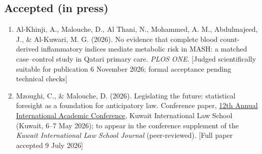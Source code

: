 \documentclass[10pt,a4paper]{article}
\begin{document}
\subsection{Accepted (in press)}
\begin{enumerate}
\item Al-Khinji, A., Malouche, D., Al Thani, N., Mohammed, A. M., Abdulmajeed, J., \& Al-Kuwari, M. G. (2026). No evidence that complete blood count-derived inflammatory indices mediate metabolic risk in MASH: a matched case--control study in Qatari primary care. \emph{PLOS ONE}. [Judged scientifically suitable for publication 6 November 2026; formal acceptance pending technical checks]
\item Mzoughi, C., \& Malouche, D. (2026). Legislating the future: statistical foresight as a foundation for anticipatory law. Conference paper, \href{https://kilaw.edu.kw/annualConference/en/conference-12-call-for-papers/}{12th Annual International Academic Conference}, Kuwait International Law School (Kuwait, 6--7 May 2026); to appear in the conference supplement of the \emph{Kuwait International Law School Journal} (peer-reviewed). [Full paper accepted 9 July 2026]
\end{enumerate}
\end{document}
